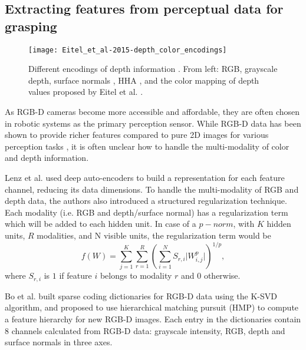 \subsection{Extracting features from perceptual data for grasping}
\begin{figure}
    \centering
    \texttt{[image: Eitel\_et\_al-2015-depth\_color\_encodings]}
    \caption{Different encodings of depth information \cite{Eitel2015}. From left: RGB, grayscale depth, surface normals
        \cite{Bo2013}, HHA \cite{Gupta2014RGBDFeatures}, and the color mapping of depth values proposed by Eitel et al.
        \cite{Eitel2015}.}
    \label{fig:depth-encodings}
\end{figure}

As RGB-D cameras become more accessible and affordable, they are often chosen in robotic systems as the primary
perception sensor. While RGB-D data has been shown to provide richer features compared to pure 2D images for various
perception tasks \cite{lenz2015,Eitel2015,Gupta2014RGBDFeatures,jiang2011}, it is often unclear how to handle the
multi-modality of color and depth information.

Lenz et al. \cite{lenz2015} used deep auto-encoders to build a representation for each feature channel, reducing its data
dimensions. To handle the multi-modality of RGB and depth data, the authors also introduced a structured regularization
technique. Each modality (i.e. RGB and depth/surface normal) has a regularization term which will be added to each
hidden unit. In case of a $p-norm$, with $K$ hidden units, $R$ modalities, and N visible units, the regularization term
would be
\[f(W) = \sum\limits^K_{j=1} \sum\limits^R_{r=1} \left( \sum\limits^N_{i=1} S_{r,i} \lvert W^p_{i,j} \rvert \right)
^{1/p}, \]
where $S_{r,i}$ is $1$ if feature $i$ belongs to modality $r$ and $0$ otherwise.

Bo et al. \cite{Bo2013} built sparse coding dictionaries for RGB-D data using the K-SVD algorithm, and proposed to use
hierarchical matching pursuit (HMP) to compute a feature hierarchy for new RGB-D images. Each entry in the dictionaries
contain 8 channels calculated from RGB-D data: grayscale intensity, RGB, depth and surface normals in three axes.

